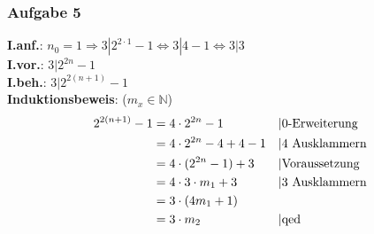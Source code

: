\subsubsection{Aufgabe 5}
\textbf{I.anf.}: $ n_0 = 1 \Rightarrow 3|2^{2\cdot1}-1 \Leftrightarrow 3|4-1 \Leftrightarrow 3|3 $\\
\textbf{I.vor.}: $ 3 | 2^{2n} - 1 $\\
\textbf{I.beh.}: $ 3 | 2^{2(n+1)} - 1 $\\
\textbf{Induktionsbeweis}: ($m_x \in \mathbb{N}$)\begin{align*}
2^{2(n+1)} - 1 &= 4 \cdot 2^{2n} - 1 							&& \text{\textbar 0-Erweiterung}\\
							&= 4 \cdot 2^{2n} - 4 + 4 - 1 			&& \text{\textbar $4$ Ausklammern}\\
							&= 4 \cdot (2^{2n} - 1) + 3 				&& \text{\textbar Voraussetzung}\\
							&= 4 \cdot 3 \cdot m_1 + 3 					&& \text{\textbar $3$ Ausklammern}\\
							&= 3 \cdot (4m_1 + 1) 							\\
							&= 3 \cdot m_2 											&& \text{\textbar qed}\end{align*}	
